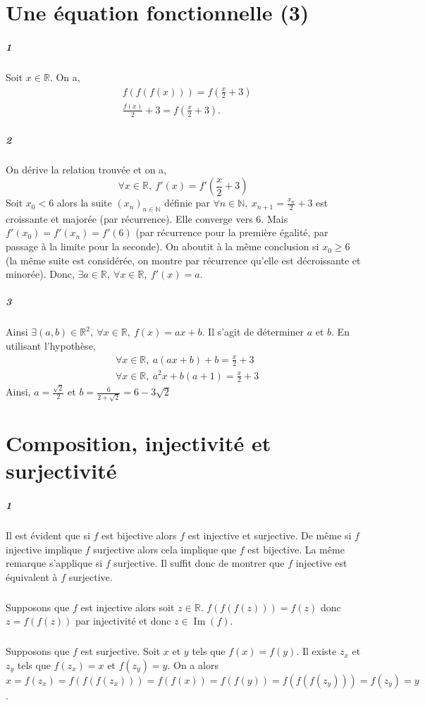 \documentclass[10pt,a4paper]{article}
\begin{document}
\section{Une équation fonctionnelle (3)}

\subparagraph{1}Soit $x \in \mathbb{R}$. On a,
\begin{equation}
\begin{aligned}
&f(f(f(x))) = f \left( \frac{x}{2}+3 \right) \\
&\frac{f(x)}{2} + 3 = f \left( \frac{x}{2}+3 \right).
\end{aligned}
\end{equation}
\subparagraph{2}On dérive la relation trouvée et on a,
\begin{equation}
\forall x \in \mathbb{R}, \ f'(x) = f'\left( \frac{x}{2}+3 \right)
\end{equation}
Soit $x_0 <6$ alors la suite $(x_n)_{n \in \mathbb{N}}$ définie par $\forall n \in \mathbb{N}, \ x_{n+1} = \frac{x_n}{2}+3$ est croissante et majorée (par récurrence). Elle converge vers $6$. Mais $f'(x_0) = f'(x_n) = f'(6)$ (par récurrence pour la première égalité, par passage à la limite pour la seconde). On aboutit à la même conclusion si $x_0 \ge 6$ (la même suite est considérée, on montre par récurrence qu'elle est décroissante et minorée). Donc, $\exists a \in \mathbb{R}, \ \forall x \in \mathbb{R}, \ f'(x) = a$.
\subparagraph{3}Ainsi $\exists (a,b) \in \mathbb{R}^2, \ \forall x \in \mathbb{R}, \ f(x) = ax+b$. Il s'agit de déterminer $a$ et $b$. En utilisant l'hypothèse,
\begin{equation}
\begin{aligned}
&\forall x \in \mathbb{R}, \ a(ax+b) +b = \frac{x}{2} +3\\
&\forall x \in \mathbb{R}, \ a^2x+b(a+1) = \frac{x}{2}+3
\end{aligned}
\end{equation}
Ainsi, $a = \frac{\sqrt{2}}{2}$ et $b = \frac{6}{2 + \sqrt{2}} = 6 - 3\sqrt{2}$

\section{Composition, injectivité et surjectivité}

\subparagraph{1}Il est évident que si $f$ est bijective alors $f$ est injective et surjective. De même si $f$ injective implique $f$ surjective alors cela implique que $f$ est bijective. La même remarque s'applique si $f$ surjective. Il suffit donc de montrer que $f$ injective est équivalent à $f$ surjective. 
\subparagraph{}Supposons que $f$ est injective alors soit $z \in \mathbb{R}$. $f(f(f(z))) = f(z)$ donc $z=f(f(z))$ par injectivité et donc $z \in \operatorname{Im}(f)$.
\subparagraph{}Supposons que $f$ est surjective. Soit $x$ et $y$ tels que $f(x)=f(y)$. Il existe $z_x$ et $z_y$ tels que $f(z_x) = x$ et $f(z_y) = y$. On a alors $x = f(z_x) = f(f(f(z_x))) = f(f(x)) = f(f(y)) = f(f(f(z_y))) = f(z_y) = y$.
\end{document}
